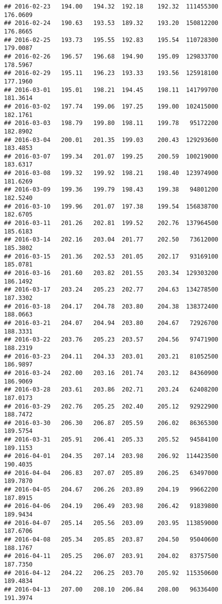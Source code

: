 \documentclass[
]{article}
\begin{document}
\begin{verbatim}
## 2016-02-23   194.00   194.32  192.18    192.32  111455300     176.0609
## 2016-02-24   190.63   193.53  189.32    193.20  150812200     176.8665
## 2016-02-25   193.73   195.55  192.83    195.54  110728300     179.0087
## 2016-02-26   196.57   196.68  194.90    195.09  129833700     178.5967
## 2016-02-29   195.11   196.23  193.33    193.56  125918100     177.1960
## 2016-03-01   195.01   198.21  194.45    198.11  141799700     181.3614
## 2016-03-02   197.74   199.06  197.25    199.00  102415000     182.1761
## 2016-03-03   198.79   199.80  198.11    199.78   95172200     182.8902
## 2016-03-04   200.01   201.35  199.03    200.43  129293600     183.4853
## 2016-03-07   199.34   201.07  199.25    200.59  100219000     183.6317
## 2016-03-08   199.32   199.92  198.21    198.40  123974900     181.6269
## 2016-03-09   199.36   199.79  198.43    199.38   94801200     182.5240
## 2016-03-10   199.96   201.07  197.38    199.54  156838700     182.6705
## 2016-03-11   201.26   202.81  199.52    202.76  137964500     185.6183
## 2016-03-14   202.16   203.04  201.77    202.50   73612000     185.3802
## 2016-03-15   201.36   202.53  201.05    202.17   93169100     185.0781
## 2016-03-16   201.60   203.82  201.55    203.34  129303200     186.1492
## 2016-03-17   203.24   205.23  202.77    204.63  134278500     187.3302
## 2016-03-18   204.17   204.78  203.80    204.38  138372400     188.0663
## 2016-03-21   204.07   204.94  203.80    204.67   72926700     188.3331
## 2016-03-22   203.76   205.23  203.57    204.56   97471900     188.2319
## 2016-03-23   204.11   204.33  203.01    203.21   81052500     186.9897
## 2016-03-24   202.00   203.16  201.74    203.12   84360900     186.9069
## 2016-03-28   203.61   203.86  202.71    203.24   62408200     187.0173
## 2016-03-29   202.76   205.25  202.40    205.12   92922900     188.7472
## 2016-03-30   206.30   206.87  205.59    206.02   86365300     189.5754
## 2016-03-31   205.91   206.41  205.33    205.52   94584100     189.1153
## 2016-04-01   204.35   207.14  203.98    206.92  114423500     190.4035
## 2016-04-04   206.83   207.07  205.89    206.25   63497000     189.7870
## 2016-04-05   204.67   206.26  203.89    204.19   99662200     187.8915
## 2016-04-06   204.19   206.49  203.98    206.42   91839800     189.9434
## 2016-04-07   205.14   205.56  203.09    203.95  113859000     187.6706
## 2016-04-08   205.34   205.85  203.87    204.50   95040600     188.1767
## 2016-04-11   205.25   206.07  203.91    204.02   83757500     187.7350
## 2016-04-12   204.22   206.25  203.70    205.92  115350600     189.4834
## 2016-04-13   207.00   208.10  206.84    208.00   96336400     191.3974

\end{verbatim}
\end{document}
